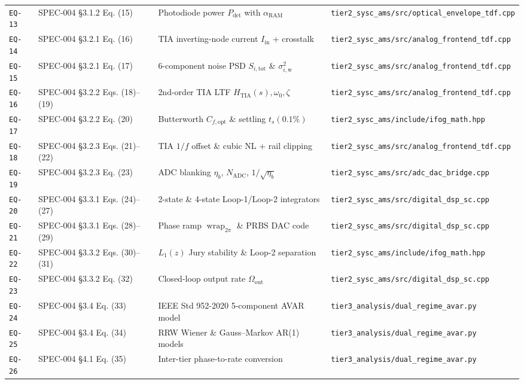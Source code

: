 \documentclass[11pt,a4paper]{article}
\begin{document}
\begin{longtable}{@{}l l l l@{}}
\texttt{EQ-13} & SPEC-004 \S 3.1.2 Eq. (15) & Photodiode power $P_{\text{det}}$ with $\alpha_{\text{RAM}}$ & \texttt{tier2\_sysc\_ams/src/optical\_envelope\_tdf.cpp} \\
\texttt{EQ-14} & SPEC-004 \S 3.2.1 Eq. (16) & TIA inverting-node current $I_{\text{in}}$ + crosstalk & \texttt{tier2\_sysc\_ams/src/analog\_frontend\_tdf.cpp} \\
\texttt{EQ-15} & SPEC-004 \S 3.2.1 Eq. (17) & 6-component noise PSD $S_{i,\text{tot}}$ \& $\sigma_{i,\text{w}}^2$ & \texttt{tier2\_sysc\_ams/src/analog\_frontend\_tdf.cpp} \\
\texttt{EQ-16} & SPEC-004 \S 3.2.2 Eqs. (18)--(19) & 2nd-order TIA LTF $H_{\text{TIA}}(s), \omega_0, \zeta$ & \texttt{tier2\_sysc\_ams/src/analog\_frontend\_tdf.cpp} \\
\texttt{EQ-17} & SPEC-004 \S 3.2.2 Eq. (20) & Butterworth $C_{f,\text{opt}}$ \& settling $t_s(0.1\%)$ & \texttt{tier2\_sysc\_ams/include/ifog\_math.hpp} \\
\texttt{EQ-18} & SPEC-004 \S 3.2.3 Eqs. (21)--(22) & TIA $1/f$ offset \& cubic NL + rail clipping & \texttt{tier2\_sysc\_ams/src/analog\_frontend\_tdf.cpp} \\
\texttt{EQ-19} & SPEC-004 \S 3.2.3 Eq. (23) & ADC blanking $\eta_b$, $N_{\text{ADC}}$, $1/\sqrt{\eta_b}$ & \texttt{tier2\_sysc\_ams/src/adc\_dac\_bridge.cpp} \\
\texttt{EQ-20} & SPEC-004 \S 3.3.1 Eqs. (24)--(27) & 2-state \& 4-state Loop-1/Loop-2 integrators & \texttt{tier2\_sysc\_ams/src/digital\_dsp\_sc.cpp} \\
\texttt{EQ-21} & SPEC-004 \S 3.3.1 Eqs. (28)--(29) & Phase ramp $\operatorname{wrap}_{2\pi}$ \& PRBS DAC code & \texttt{tier2\_sysc\_ams/src/digital\_dsp\_sc.cpp} \\
\texttt{EQ-22} & SPEC-004 \S 3.3.2 Eqs. (30)--(31) & $L_1(z)$ Jury stability \& Loop-2 separation & \texttt{tier2\_sysc\_ams/include/ifog\_math.hpp} \\
\texttt{EQ-23} & SPEC-004 \S 3.3.2 Eq. (32) & Closed-loop output rate $\Omega_{\text{out}}$ & \texttt{tier2\_sysc\_ams/src/digital\_dsp\_sc.cpp} \\
\texttt{EQ-24} & SPEC-004 \S 3.4 Eq. (33) & IEEE Std 952-2020 5-component AVAR model & \texttt{tier3\_analysis/dual\_regime\_avar.py} \\
\texttt{EQ-25} & SPEC-004 \S 3.4 Eq. (34) & RRW Wiener \& Gauss--Markov AR(1) models & \texttt{tier3\_analysis/dual\_regime\_avar.py} \\
\texttt{EQ-26} & SPEC-004 \S 4.1 Eq. (35) & Inter-tier phase-to-rate conversion & \texttt{tier3\_analysis/dual\_regime\_avar.py} \\

\end{longtable}
\end{document}
